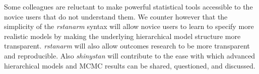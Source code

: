 \documentclass[11pt,notitlepage]{article}
\begin{document}
Some colleagues are reluctant to make powerful statistical tools accessible to the novice users that do not understand them. We counter 
however that the simplicity of the \textit{rstanarm} syntax will allow novice users to learn to specify more realistic models by 
making the underlying hierarchical model structure more transparent.  \textit{rstanarm} will also allow outcomes research to be 
more transparent and reproducible. Also \textit{shinystan} will contribute to the ease with which advanced hierarchical models and MCMC 
results can be shared, questioned, and discussed.



\newpage 

\newpage


\end{document}
